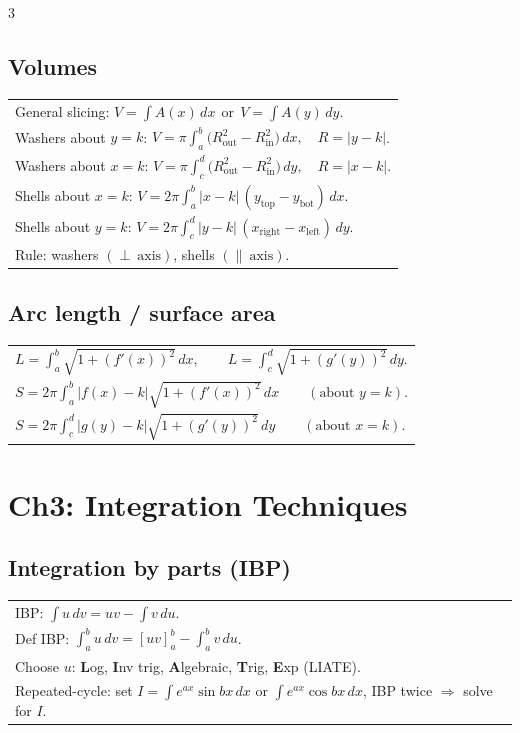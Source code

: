 \documentclass[10pt]{article}
\newcommand{\dx}{\,dx}
\newcommand{\dy}{\,dy}
\begin{document}
\begin{multicols}{3}
\subsection*{Volumes}
\begin{tabular}{@{}p{}@{}}
General slicing: $V=\displaystyle\int A(x)\dx \ \ \text{or}\ \ V=\int A(y)\dy$.\\
Washers about $y=k$: $V=\displaystyle \pi\int_a^b\big(R_{\text{out}}^2-R_{\text{in}}^2\big)\dx,\quad R=|y-k|$.\\
Washers about $x=k$: $V=\displaystyle \pi\int_c^d\big(R_{\text{out}}^2-R_{\text{in}}^2\big)\dy,\quad R=|x-k|$.\\
Shells about $x=k$: $V=\displaystyle 2\pi\int_a^b |x-k|\,(y_{\text{top}}-y_{\text{bot}})\dx$.\\
Shells about $y=k$: $V=\displaystyle 2\pi\int_c^d |y-k|\,(x_{\text{right}}-x_{\text{left}})\dy$.\\
Rule: washers $(\perp\ \text{axis})$, shells $(\parallel\ \text{axis})$.\\
\end{tabular}

\subsection*{Arc length / surface area}
\begin{tabular}{@{}p{}@{}}
$L=\displaystyle\int_a^b \sqrt{1+(f'(x))^2}\dx,\qquad
L=\int_c^d \sqrt{1+(g'(y))^2}\dy.$\\
$S=\displaystyle 2\pi\int_a^b |f(x)-k|\sqrt{1+(f'(x))^2}\dx \qquad (\text{about }y=k).$\\
$S=\displaystyle 2\pi\int_c^d |g(y)-k|\sqrt{1+(g'(y))^2}\dy \qquad (\text{about }x=k).$\\
\end{tabular}

\section*{Ch3: Integration Techniques}
\subsection*{Integration by parts (IBP)}
\vspace{-1pt}
\begin{tabular}{@{}p{}@{}}
IBP: $\displaystyle\int u\,dv=uv-\int v\,du$.\\
Def IBP: $\displaystyle\int_a^b u\,dv=[uv]_a^b-\int_a^b v\,du$.\\
Choose $u$: \textbf{L}og, \textbf{I}nv trig, \textbf{A}lgebraic, \textbf{T}rig, \textbf{E}xp (LIATE).\\
Repeated-cycle: set $I=\int e^{ax}\sin bx\,dx$ or $\int e^{ax}\cos bx\,dx$, IBP twice $\Rightarrow$ solve for $I$.\\
\end{tabular}

\end{multicols}
\end{document}
